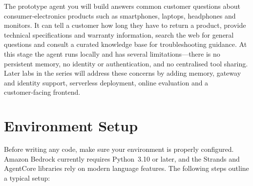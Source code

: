 The prototype agent you will build answers common customer questions about
consumer‑electronics products such as smartphones, laptops, headphones and
monitors.  It can tell a customer how long they have to return a product,
provide technical specifications and warranty information, search the web for
general questions and consult a curated knowledge base for troubleshooting
guidance.  At this stage the agent runs locally and has several
limitations—there is no persistent memory, no identity or authentication, and
no centralised tool sharing.  Later labs in the series will address these
concerns by adding memory, gateway and identity support, serverless
deployment, online evaluation and a customer‑facing frontend.

\section{Environment Setup}

Before writing any code, make sure your environment is properly configured.
Amazon Bedrock currently requires Python 3.10 or later, and the Strands and
AgentCore libraries rely on modern language features.  The following steps
outline a typical setup:

